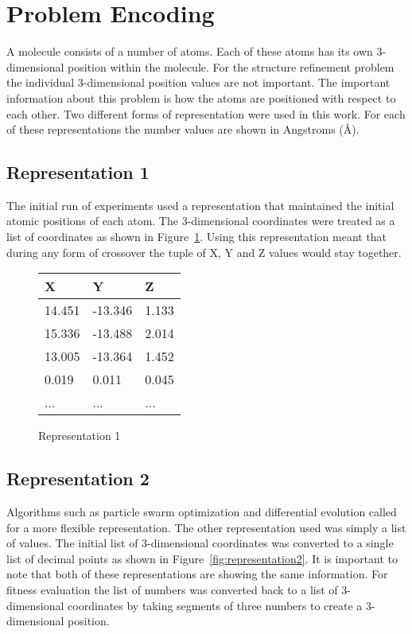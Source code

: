 \section{Problem Encoding}
\label{sec:problem-encoding}

A molecule consists of a number of atoms. Each of these atoms has its own 3-dimensional position within the molecule. For the structure refinement problem the individual 3-dimensional position values are not important. The important information about this problem is how the atoms are positioned with respect to each other. Two different forms of representation were used in this work. For each of these representations the number values are shown in Angstroms (\AA).

\subsection{Representation 1}
\label{subsec:encoding-1}

The initial run of experiments used a representation that maintained the initial atomic positions of each atom. The 3-dimensional coordinates were treated as a list of coordinates as shown in Figure~\ref{fig:representation1}. Using this representation meant that during any form of crossover the tuple of X, Y and Z values would stay together.

\begin{figure}
	\centering
	\begin{tabular}{ | l | l | l | }
		\hline
		X & Y & Z \\ \hline
		14.451 & -13.346 & 1.133 \\ \hline
		15.336 & -13.488 & 2.014 \\ \hline
		13.005 & -13.364 & 1.452 \\ \hline
		0.019 & 0.011 & 0.045 \\ \hline
		... & ... & ... \\ \hline
	\end{tabular}
	\caption{Representation 1}
	\label{fig:representation1}
\end{figure}

\subsection{Representation 2}
\label{subsec:encoding-2}

Algorithms such as particle swarm optimization and differential evolution called for a more flexible representation. The other representation used was simply a list of values. The initial list of 3-dimensional coordinates was converted to a single list of decimal points as shown in Figure~\ref{fig:representation2}. It is important to note that both of these representations are showing the same information. For fitness evaluation the list of numbers was converted back to a list of 3-dimensional coordinates by taking segments of three numbers to create a 3-dimensional position.


